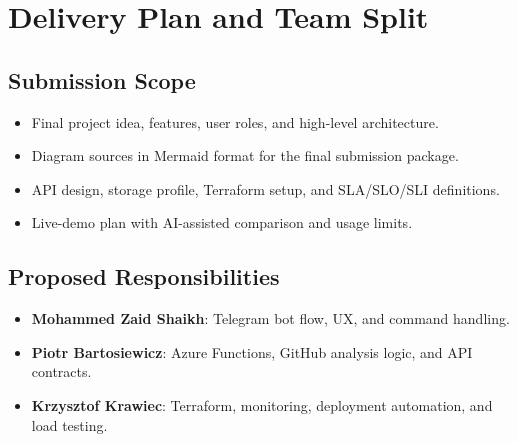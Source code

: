 \documentclass[11pt]{article}
\begin{document}
\section{Delivery Plan and Team Split}
\subsection{Submission Scope}
\begin{itemize}[leftmargin=*]
  \item Final project idea, features, user roles, and high-level architecture.
  \item Diagram sources in Mermaid format for the final submission package.
  \item API design, storage profile, Terraform setup, and SLA/SLO/SLI definitions.
  \item Live-demo plan with AI-assisted comparison and usage limits.
\end{itemize}

\subsection{Proposed Responsibilities}
\begin{itemize}[leftmargin=*]
  \item \textbf{Mohammed Zaid Shaikh}: Telegram bot flow, UX, and command handling.
  \item \textbf{Piotr Bartosiewicz}: Azure Functions, GitHub analysis logic, and API contracts.
  \item \textbf{Krzysztof Krawiec}: Terraform, monitoring, deployment automation, and load testing.
\end{itemize}
\end{document}
